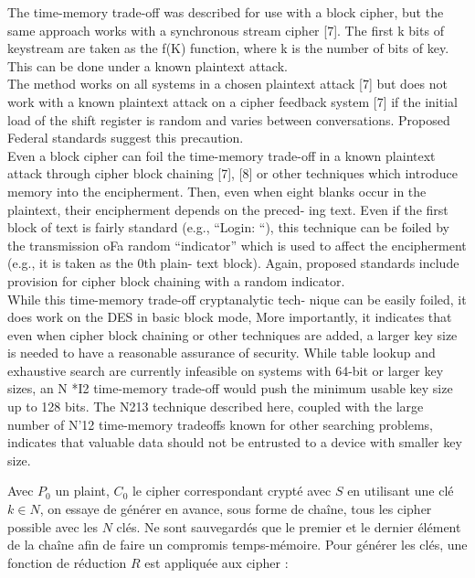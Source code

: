 
	The time-memory trade-off was described for use with a block cipher, but the same approach works with a synchronous stream cipher [7]. The first k bits of keystream are taken as the f(K) function, where k is the number of bits of key. This can be done under a known plaintext attack.\\

	The method works on all systems in a chosen plaintext attack [7] but does not work with a known plaintext attack on a cipher feedback system [7] if the initial load of the shift register is random and varies between conversations. Proposed Federal standards suggest this precaution.\\

	Even a block cipher can foil the time-memory trade-off in a known plaintext attack through cipher block chaining [7], [8] or other techniques which introduce memory into the encipherment. Then, even when eight blanks occur in the plaintext, their encipherment depends on the preced- ing text. Even if the first block of text is fairly standard (e.g., “Login: “), this technique can be foiled by the transmission oFa random “indicator”  which is used to affect the encipherment (e.g., it is taken as the 0th plain- text block). Again, proposed standards include provision for cipher block chaining with a random indicator.\\

	While this time-memory trade-off cryptanalytic tech- nique can be easily foiled, it does work on the DES in basic block mode, More importantly, it indicates that even when cipher block chaining or other techniques are added, a larger key size is needed to have a reasonable assurance of security. While table lookup and exhaustive search are currently infeasible on systems with 64-bit or larger key sizes, an N *I2 time-memory trade-off would push the minimum usable key size up to 128 bits. The N213 technique described here, coupled with the large number of N’12 time-memory tradeoffs known for other searching problems, indicates that valuable data should not be entrusted to a device with smaller key size.


	Avec $P_0$ un \gls{plaint}, $C_0$ le \gls{cipher} correspondant crypté avec $S$ en utilisant une clé $k \in N$, on essaye de générer en avance, sous forme de chaîne, tous les \gls{cipher} possible avec les $N$ clés. Ne sont sauvegardés que le premier et le dernier élément de la chaîne afin de faire un compromis temps-mémoire. Pour générer les clés, une fonction de réduction $R$ est appliquée aux \gls{cipher} :

